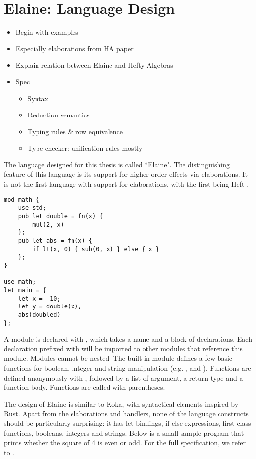 \chapter{Elaine: Language Design}

\begin{itemize}
\item Begin with examples
\item Especially elaborations from HA paper
\item Explain relation between Elaine and Hefty Algebras
\item Spec
    \begin{itemize}
    \item Syntax
    \item Reduction semantics
    \item Typing rules \& row equivalence
    \item Type checker: unification rules mostly
    \end{itemize}
\end{itemize}

The language designed for this thesis is called ``Elaine". The distinguishing feature of this language is its support for higher-order effects via elaborations. It is not the first language with support for elaborations, with the first being Heft \citationneeded.

\begin{lstlisting}[style=fancy]
mod math {
    use std;
    pub let double = fn(x) {
        mul(2, x)
    };
    pub let abs = fn(x) {
        if lt(x, 0) { sub(0, x) } else { x }
    };
}

use math;
let main = {
    let x = -10;
    let y = double(x);
    abs(doubled)
};
\end{lstlisting}
    
A module is declared with , which takes a name and a block of declarations. Each declaration prefixed with  will be imported to other modules that reference this module. Modules cannot be nested. The built-in  module defines a few basic functions for boolean, integer and string manipulation (e.g. ,  and ). Functions are defined anonymously with , followed by a list of argument, a return type and a function body. Functions are called with parentheses.

The design of Elaine is similar to Koka, with syntactical elements inspired by Rust. Apart from the elaborations and handlers, none of the language constructs should be particularly surprising: it has let bindings, if-else expressions, first-class functions, booleans, integers and strings. Below is a small sample program that prints whether the square of 4 is even or odd. For the full specification, we refer to .

